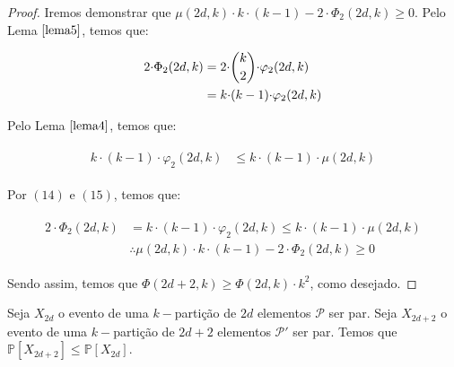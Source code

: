 \documentclass[12pt]{article}
\begin{document}
\begin{proof}
  	Iremos demonstrar que $\mu(2d, k){\cdot} k {\cdot} (k-1) - 2 {\cdot} \Phi_2(2d, k) \geq 0$. Pelo Lema $\ref{lema5}$, temos que: 
  	
  	\begin{align}
  		\begin{split}
  			2 {\cdot} \Phi_2(2d, k) &= 2 {\cdot} \escolhe{k}{2} {\cdot} \varphi_2(2d, k) \\
  			& = k {\cdot}  (k-1) {\cdot} \varphi_2(2d, k)
  		\end{split} 
  	\end{align}  
  	
  	Pelo Lema $\ref{lema4}$, temos que: 
  	
  	\begin{align}
  		\begin{split}
  			k {\cdot}  (k-1) {\cdot} \varphi_2(2d, k) &\leq k {\cdot}  (k-1) {\cdot} \mu(2d, k)
  		\end{split} 
  	\end{align}  
  	
  	Por $(14)$ e $(15)$, temos que:
  	
  	\begin{align}
  		\begin{split}
  			2 {\cdot} \Phi_2(2d, k) & = k {\cdot}  (k-1) {\cdot} \varphi_2(2d, k) \leq k {\cdot}  (k-1) {\cdot} \mu(2d, k) \\
  			& \therefore \mu(2d, k){\cdot} k {\cdot}  (k-1) - 2 {\cdot} \Phi_2(2d, k) \geq 0
  		\end{split} 
  	\end{align} 
  	
  	Sendo assim, temos que $\Phi(2d+2, k) \geq \Phi(2d, k) {\cdot} k^2$, como desejado.
  	
  \end{proof} \newl
  
  
  \begin{lema}  
  	\label{lema9} 
  	Seja $X_{2d}$ o evento de uma $k-$partição de $2d$ elementos $\mathcal{P}$ ser par. Seja $X_{2d+2}$ o evento de uma $k-$partição de $2d + 2$ elementos $\mathcal{P'}$ ser par. Temos que $\mathds{P}[X_{2d+2}] \leq \mathds{P}[X_{2d}]$.
  \end{lema}
  
  
  
\end{document}

